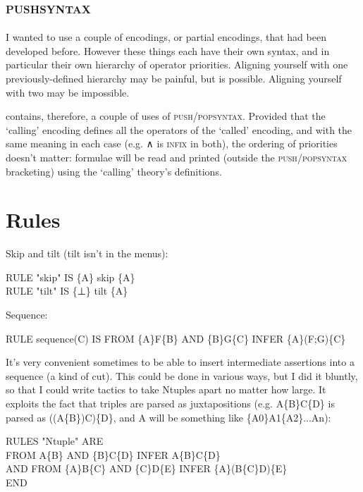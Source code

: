 \subsection{\textsc{pushsyntax}}
\label{Hoare:pushsyntax}

I wanted to use a couple of encodings, or partial encodings, that had been developed before. However these things each have their own syntax, and in particular their own hierarchy of operator priorities. Aligning yourself with one previously-defined hierarchy may be painful, but is possible. Aligning yourself with two may be impossible.

 contains, therefore, a couple of uses of \textsc{push}/\textsc{popsyntax}. Provided that the `calling' encoding defines all the operators of the `called' encoding, and with the same meaning in each case (e.g. ∧ is \textsc{infix} in both), the ordering of priorities doesn't matter: formulae will be read and printed (outside the \textsc{push}/\textsc{popsyntax} bracketing) using the `calling' theory's definitions.

\section{Rules}

Skip and tilt (tilt isn't in the menus):
\begin{japeish}
RULE "skip" IS \{A\} skip \{A\} \\
RULE "tilt" IS \{⊥\} tilt \{A\}
\end{japeish}
 
Sequence:
\begin{japeish}
RULE sequence(C) IS FROM \{A\}F\{B\} AND  \{B\}G\{C\} INFER  \{A\}(F;G)\{C\}
\end{japeish}

It's very convenient sometimes to be able to insert intermediate assertions into a sequence (a kind of cut). This could be done in various ways, but I did it bluntly, so that I could write tactics to take Ntuples apart no matter how large. It exploits the fact that triples are parsed as juxtapositions (e.g. A\{B\}C\{D\} is parsed as ((A\{B\})C)\{D\}, and A will be something like \{A0\}A1\{A2\}...An):
\begin{japeish}
RULES "Ntuple" ARE \\
\tab FROM A\{B\} AND \{B\}C\{D\} INFER A\{B\}C\{D\} \\
AND FROM \{A\}B\{C\} AND \{C\}D\{E\} INFER \{A\}(B\{C\}D)\{E\} \\
END
\end{japeish}


